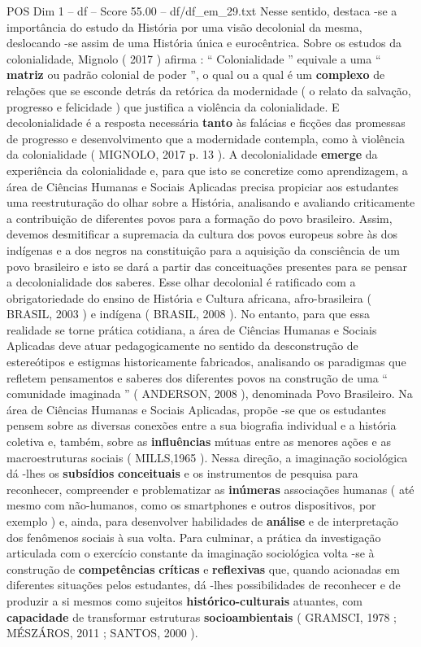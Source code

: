 \begin{textsample}{POS Dim 1 – df – Score 55.00 – df/df\_em\_29.txt}
Nesse sentido, destaca -se a importância do estudo da História por uma visão decolonial da mesma, deslocando -se assim de uma História única e eurocêntrica.
Sobre os estudos da colonialidade, Mignolo ( 2017 ) afirma : “ Colonialidade ” equivale a uma “ \textbf{matriz} ou padrão colonial de poder ”, o qual ou a qual é um \textbf{complexo} de relações que se esconde detrás da retórica da modernidade ( o relato da salvação, progresso e felicidade ) que justifica a violência da colonialidade.
E decolonialidade é a resposta necessária \textbf{tanto} às falácias e ficções das promessas de progresso e desenvolvimento que a modernidade contempla, como à violência da colonialidade ( MIGNOLO, 2017 p. 13 ).
A decolonialidade \textbf{emerge} da experiência da colonialidade e, para que isto se concretize como aprendizagem, a área de Ciências Humanas e Sociais Aplicadas precisa propiciar aos estudantes uma reestruturação do olhar sobre a História, analisando e avaliando criticamente a contribuição de diferentes povos para a formação do povo brasileiro.
Assim, devemos desmitificar a supremacia da cultura dos povos europeus sobre às dos indígenas e a dos negros na constituição para a aquisição da consciência de um povo brasileiro e isto se dará a partir das conceituações presentes para se pensar a decolonialidade dos saberes.
Esse olhar decolonial é ratificado com a obrigatoriedade do ensino de História e Cultura africana, afro-brasileira ( BRASIL, 2003 ) e indígena ( BRASIL, 2008 ).
No entanto, para que essa realidade se torne prática cotidiana, a área de Ciências Humanas e Sociais Aplicadas deve atuar pedagogicamente no sentido da desconstrução de estereótipos e estigmas historicamente fabricados, analisando os paradigmas que refletem pensamentos e saberes dos diferentes povos na construção de uma “ comunidade imaginada ” ( ANDERSON, 2008 ), denominada Povo Brasileiro.
Na área de Ciências Humanas e Sociais Aplicadas, propõe -se que os estudantes pensem sobre as diversas conexões entre a sua biografia individual e a história coletiva e, também, sobre as \textbf{influências} mútuas entre as menores ações e as macroestruturas sociais ( MILLS,1965 ).
Nessa direção, a imaginação sociológica dá -lhes os \textbf{subsídios} \textbf{conceituais} e os instrumentos de pesquisa para reconhecer, compreender e problematizar as \textbf{inúmeras} associações humanas ( até mesmo com não-humanos, como os smartphones e outros dispositivos, por exemplo ) e, ainda, para desenvolver habilidades de \textbf{análise} e de interpretação dos fenômenos sociais à sua volta.
Para culminar, a prática da investigação articulada com o exercício constante da imaginação sociológica volta -se à construção de \textbf{competências} \textbf{críticas} e \textbf{reflexivas} que, quando acionadas em diferentes situações pelos estudantes, dá -lhes possibilidades de reconhecer e de produzir a si mesmos como sujeitos \textbf{histórico-culturais} atuantes, com \textbf{capacidade} de transformar estruturas \textbf{socioambientais} ( GRAMSCI, 1978 ; MÉSZÁROS, 2011 ; SANTOS, 2000 ).

\end{textsample}
